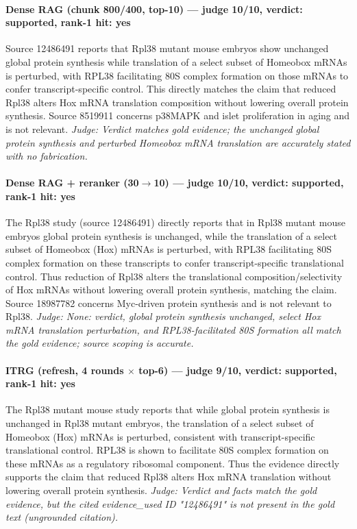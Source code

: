 \documentclass[sigconf, review, anonymous]{acmart}
\begin{document}
\paragraph{Dense RAG (chunk 800/400, top-10) --- judge 10/10, verdict: supported, rank-1 hit: yes}
\noindent Source 12486491 reports that Rpl38 mutant mouse embryos show unchanged global protein synthesis while translation of a select subset of Homeobox mRNAs is perturbed, with RPL38 facilitating 80S complex formation on those mRNAs to confer transcript-specific control. This directly matches the claim that reduced Rpl38 alters Hox mRNA translation composition without lowering overall protein synthesis. Source 8519911 concerns p38MAPK and islet proliferation in aging and is not relevant.
\noindent\small\textit{Judge: Verdict matches gold evidence; the unchanged global protein synthesis and perturbed Homeobox mRNA translation are accurately stated with no fabrication.}
\paragraph{Dense RAG + reranker (30$\to$10) --- judge 10/10, verdict: supported, rank-1 hit: yes}
\noindent The Rpl38 study (source 12486491) directly reports that in Rpl38 mutant mouse embryos global protein synthesis is unchanged, while the translation of a select subset of Homeobox (Hox) mRNAs is perturbed, with RPL38 facilitating 80S complex formation on these transcripts to confer transcript-specific translational control. Thus reduction of Rpl38 alters the translational composition/selectivity of Hox mRNAs without lowering overall protein synthesis, matching the claim. Source 18987782 concerns Myc-driven protein synthesis and is not relevant to Rpl38.
\noindent\small\textit{Judge: None: verdict, global protein synthesis unchanged, select Hox mRNA translation perturbation, and RPL38-facilitated 80S formation all match the gold evidence; source scoping is accurate.}
\paragraph{ITRG (refresh, 4 rounds $\times$ top-6) --- judge 9/10, verdict: supported, rank-1 hit: yes}
\noindent The Rpl38 mutant mouse study reports that while global protein synthesis is unchanged in Rpl38 mutant embryos, the translation of a select subset of Homeobox (Hox) mRNAs is perturbed, consistent with transcript-specific translational control. RPL38 is shown to facilitate 80S complex formation on these mRNAs as a regulatory ribosomal component. Thus the evidence directly supports the claim that reduced Rpl38 alters Hox mRNA translation without lowering overall protein synthesis.
\noindent\small\textit{Judge: Verdict and facts match the gold evidence, but the cited evidence\_used ID "12486491" is not present in the gold text (ungrounded citation).}
\end{document}
